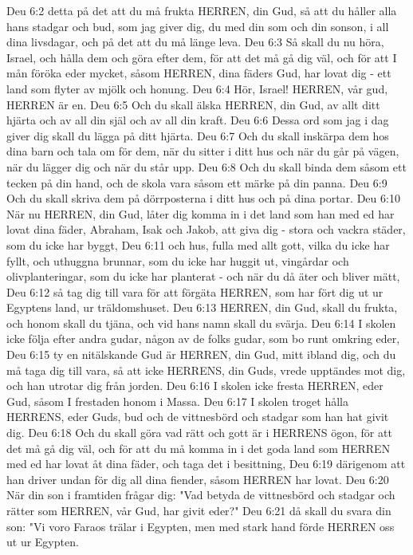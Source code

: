 Deu 6:2  detta på det att du må frukta HERREN, din Gud, så att du håller alla hans stadgar och bud, som jag giver dig, du med din som och din sonson, i all dina livsdagar, och på det att du må länge leva.
Deu 6:3  Så skall du nu höra, Israel, och hålla dem och göra efter dem, för att det må gå dig väl, och för att I mån föröka eder mycket, såsom HERREN, dina fäders Gud, har lovat dig - ett land som flyter av mjölk och honung.
Deu 6:4  Hör, Israel! HERREN, vår gud, HERREN är en.
Deu 6:5  Och du skall älska HERREN, din Gud, av allt ditt hjärta och av all din själ och av all din kraft.
Deu 6:6  Dessa ord som jag i dag giver dig skall du lägga på ditt hjärta.
Deu 6:7  Och du skall inskärpa dem hos dina barn och tala om för dem, när du sitter i ditt hus och när du går på vägen, när du lägger dig och när du står upp.
Deu 6:8  Och du skall binda dem såsom ett tecken på din hand, och de skola vara såsom ett märke på din panna.
Deu 6:9  Och du skall skriva dem på dörrposterna i ditt hus och på dina portar.
Deu 6:10  När nu HERREN, din Gud, låter dig komma in i det land som han med ed har lovat dina fäder, Abraham, Isak och Jakob, att giva dig - stora och vackra städer, som du icke har byggt,
Deu 6:11  och hus, fulla med allt gott, vilka du icke har fyllt, och uthuggna brunnar, som du icke har huggit ut, vingårdar och olivplanteringar, som du icke har planterat - och när du då äter och bliver mätt,
Deu 6:12  så tag dig till vara för att förgäta HERREN, som har fört dig ut ur Egyptens land, ur träldomshuset.
Deu 6:13  HERREN, din Gud, skall du frukta, och honom skall du tjäna, och vid hans namn skall du svärja.
Deu 6:14  I skolen icke följa efter andra gudar, någon av de folks gudar, som bo runt omkring eder,
Deu 6:15  ty en nitälskande Gud är HERREN, din Gud, mitt ibland dig, och du må taga dig till vara, så att icke HERRENS, din Guds, vrede upptändes mot dig, och han utrotar dig från jorden.
Deu 6:16  I skolen icke fresta HERREN, eder Gud, såsom I frestaden honom i Massa.
Deu 6:17  I skolen troget hålla HERRENS, eder Guds, bud och de vittnesbörd och stadgar som han hat givit dig.
Deu 6:18  Och du skall göra vad rätt och gott är i HERRENS ögon, för att det må gå dig väl, och för att du må komma in i det goda land som HERREN med ed har lovat åt dina fäder, och taga det i besittning,
Deu 6:19  därigenom att han driver undan för dig all dina fiender, såsom HERREN har lovat.
Deu 6:20  När din son i framtiden frågar dig: "Vad betyda de vittnesbörd och stadgar och rätter som HERREN, vår Gud, har givit eder?"
Deu 6:21  då skall du svara din son: "Vi voro Faraos trälar i Egypten, men med stark hand förde HERREN oss ut ur Egypten.
